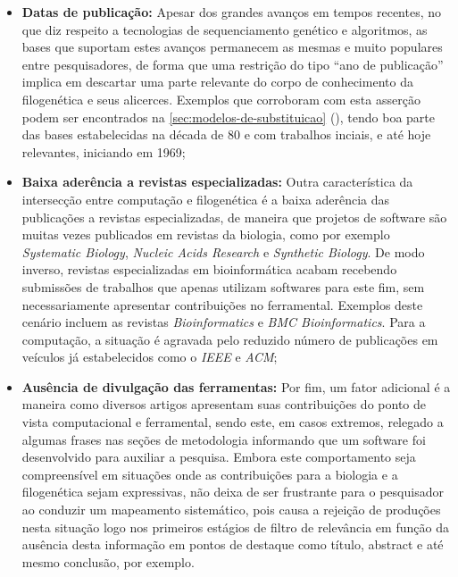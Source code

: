 \documentclass[english,brazilian]{UNISINOSmonografia} %
\begin{document}
\begin{itemize}
	
	\item \textbf{Datas de publicação:}
	Apesar dos grandes avanços em tempos recentes, no que diz respeito a tecnologias de sequenciamento genético e algoritmos, as bases que suportam estes avanços permanecem as mesmas e muito populares entre pesquisadores, de forma que uma restrição do tipo ``ano de publicação'' implica em descartar uma parte relevante do corpo de conhecimento da filogenética e seus alicerces.
	Exemplos que corroboram com esta asserção podem ser encontrados na \autoref{sec:modelos-de-substituicao} (), tendo boa parte das bases estabelecidas na década de 80 e com trabalhos inciais, e até hoje relevantes, iniciando em 1969;
	
	\item \textbf{Baixa aderência a revistas especializadas:}
	Outra característica da intersecção entre computação e filogenética é a baixa aderência das publicações a revistas especializadas, de maneira que projetos de software são muitas vezes publicados em revistas da biologia, como por exemplo \textit{Systematic Biology}, \textit{Nucleic Acids Research} e \textit{Synthetic Biology}. 
	De modo inverso, revistas especializadas em bioinformática acabam recebendo submissões de trabalhos que apenas utilizam softwares para este fim, sem necessariamente apresentar contribuições no ferramental. Exemplos deste cenário incluem as revistas \textit{Bioinformatics} e \textit{BMC Bioinformatics}.
	Para a computação, a situação é agravada pelo reduzido número de publicações em veículos já estabelecidos como o \textit{IEEE} e \textit{ACM};
	
	\item \textbf{Ausência de divulgação das ferramentas:}
	Por fim, um fator adicional é a maneira como diversos artigos apresentam suas contribuições do ponto de vista computacional e ferramental, sendo este, em casos extremos, relegado a algumas frases nas seções de metodologia informando que um software foi desenvolvido para auxiliar a pesquisa. Embora este comportamento seja compreensível em situações onde as contribuições para a biologia e a filogenética sejam expressivas, não deixa de ser frustrante para o pesquisador ao conduzir um mapeamento sistemático, pois causa a rejeição de produções nesta situação logo nos primeiros estágios de filtro de relevância em função da ausência desta informação em pontos de destaque como título, abstract e até mesmo conclusão, por exemplo.

\end{itemize}
\end{document}
